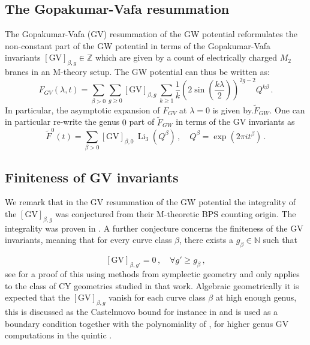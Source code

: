 \documentclass[a4paper,12pt,justification=centering]{article}
\numberwithin{equation}{section}
\theoremstyle{plain}%
\theoremstyle{definition}
\begin{document}
\subsection{The Gopakumar-Vafa resummation}

The Gopakumar-Vafa (GV) resummation of the GW potential \cite{Gopakumar:1998ii,Gopakumar:1998jq} reformulates the non-constant part of the GW potential in terms of the Gopakumar-Vafa invariants  $[\textrm{GV}]_{\beta,g} \in \mathbb{Z}$ which are given by a count of electrically charged $M_2$ branes in an M-theory setup. The GW potential can thus be written as:
\begin{equation}\label{GVresum}
F_{GV}(\lambda,t)= \sum_{\beta>0}\sum_{g\ge 0} [\textrm{GV}]_{\beta,g}\, \sum_{k\ge 1} \frac{1}{k} \left( 2 \sin \left( \frac{k\lambda}{2}\right)\right)^{2g-2} Q^{k\beta}\, .
\end{equation}
In particular, the asymptotic expansion of $F_{GV}$ at  $\lambda=0$ is given by.$\tilde{F}_{GW}$. One can in particular re-write the genus $0$ part of $\tilde{F}_{GW}$ in terms of the GV invariants as 
$$ \tilde{F}^0(t)=\sum_{\beta>0} [\textrm{GV}]_{\beta,0}\, \operatorname{Li}_3(Q^{\beta})\,, \quad Q^{\beta}= \exp(2\pi i t^{\beta})\,.$$ 



\subsection{Finiteness of GV invariants}\label{sec:finiteness}
We remark that in the GV resummation of the GW potential the integrality of the $[\textrm{GV}]_{\beta,g}$ was conjectured from their M-theoretic BPS counting origin. The integrality was proven in \cite{Ionel}. A further conjecture concerns the finiteness of the GV invariants, meaning that for every curve class $\beta$, there exists a $g_{\beta}\in \mathbb{N}$ such that 

$$[\textrm{GV}]_{\beta,g'}=0 \,, \quad \forall g'\ge g_{\beta}\,,$$
see \cite{Doan} for a proof of this using methods from symplectic geometry and only applies to the class of CY geometries studied in that work. Algebraic geometrically it is expected that the $[\textrm{GV}]_{\beta,g}$ vanish for each curve class $\beta$ at high enough genus, this is discussed as the Castelnuovo bound for instance in \cite{Katz:1999xq} and is used as a boundary condition together with the polynomiality of \cite{Yamaguchi:2004bt}, for higher genus GV computations in the quintic \cite{Huang:2006hq}. 
\end{document}
